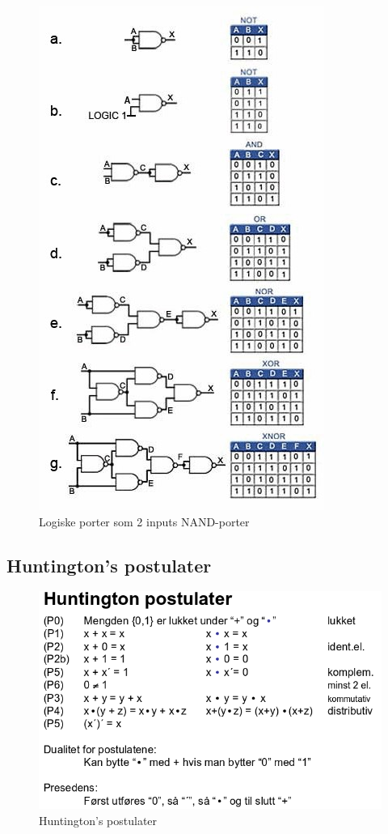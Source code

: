 \documentclass{article}
\begin{document}
	\begin{figure}[H]
		\includegraphics{NAND.jpg}
		\caption{Logiske porter som 2 inputs NAND-porter}
	\end{figure}
	
	\subsection{Huntington's postulater}
	\begin{figure}[H]
		\includegraphics[scale=0.35]{Huntington.png}
		\caption{Huntington's postulater}
	\end{figure}
	
\end{document}
